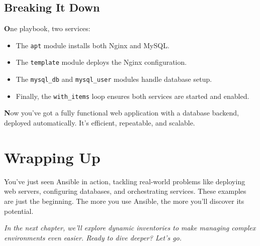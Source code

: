 \subsection{Breaking It Down}

\textbf{O}ne playbook, two services:
\begin{itemize}
    \item The \texttt{apt} module installs both Nginx and MySQL.
    \item The \texttt{template} module deploys the Nginx configuration.
    \item The \texttt{mysql\_db} and \texttt{mysql\_user} modules handle database setup.
    \item Finally, the \texttt{with\_items} loop ensures both services are started and enabled.
\end{itemize}

\textbf{N}ow you've got a fully functional web application with a database backend, deployed automatically. It's efficient, repeatable, and scalable.


\section{Wrapping Up}

You've just seen Ansible in action, tackling real-world problems like deploying web servers, configuring databases, and orchestrating services. These examples are just the beginning. The more you use Ansible, the more you'll discover its potential.

\vspace{1em}
\textit{In the next chapter, we'll explore dynamic inventories to make managing complex environments even easier. Ready to dive deeper? Let's go.}
